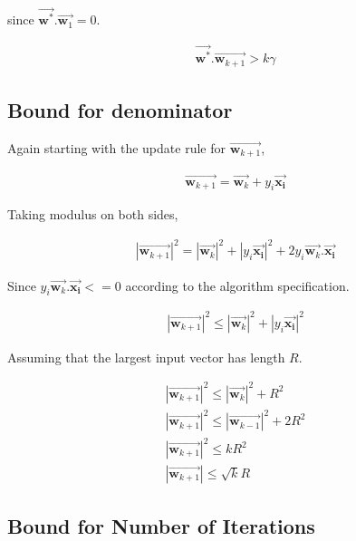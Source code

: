 \documentclass[11pt, a4paper]{article}
\begin{document}
since $\vec{\boldsymbol{w}^*}.\vec{\boldsymbol{w}_{1}} = 0$.

 
\begin{align*}
	\vec{\boldsymbol{w}^*}.\vec{\boldsymbol{w}_{k+1}} >  k\gamma 
\end{align*}  
 
\subsection{Bound for denominator}
 
Again starting with the update rule for $\vec{\boldsymbol{w}_{k+1}}$,
 
\begin{align*}
	\vec{\boldsymbol{w}_{k+1}} = \vec{\boldsymbol{w}_k} + y_i \vec{\boldsymbol{\boldsymbol{x}_i}} 
\end{align*}
 
Taking modulus on both sides,
 
\begin{align*}
	|\vec{\boldsymbol{w}_{k+1}}|^2 = |\vec{\boldsymbol{w}_k}|^2 + |y_i \vec{\boldsymbol{\boldsymbol{x}_i}}|^2 + 2y_i \vec{\boldsymbol{w}_k}.\vec{\boldsymbol{\boldsymbol{x}_i}} 
\end{align*}
 
Since $y_i \vec{\boldsymbol{w}_k}.\vec{\boldsymbol{\boldsymbol{x}_i}} <= 0$ according to the algorithm specification.

\begin{align*}
	|\vec{\boldsymbol{w}_{k+1}}|^2 \leq |\vec{\boldsymbol{w}_k}|^2 + |y_i \vec{\boldsymbol{\boldsymbol{x}_i}}|^2 
\end{align*}
 
Assuming that the largest input vector has length $R$.
 
\begin{align*}
	|\vec{\boldsymbol{w}_{k+1}}|^2 \leq |\vec{\boldsymbol{w}_k}|^2 + R^2      \\
	|\vec{\boldsymbol{w}_{k+1}}|^2 \leq |\vec{\boldsymbol{w}_{k-1}}|^2 + 2R^2 \\
	|\vec{\boldsymbol{w}_{k+1}}|^2 \leq kR^2                                  \\
	|\vec{\boldsymbol{w}_{k+1}}| \leq \sqrt{k}R                               
\end{align*}
 
\subsection{Bound for Number of Iterations}
 
\end{document}
